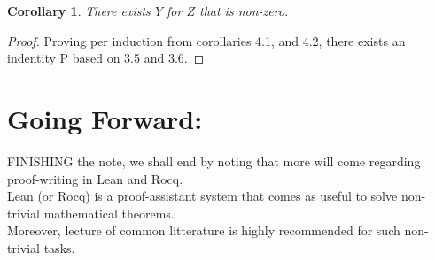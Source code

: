 \documentclass[10pt]{article}
\theoremstyle{plain}
\newtheorem{corollary}[theorem]{Corollary}
\theoremstyle{definition}
\theoremstyle{remark}
\begin{document}
\begin{corollary}
	There exists $Y$ for $Z$ that is non-zero.
\end{corollary}

\begin{proof}
	Proving per induction from corollaries 4.1, and 4.2, there exists an indentity P based on 3.5 and 3.6.
\end{proof}

\section{Going Forward:}

\lettrine[lines=2, lhang=0.1, loversize=0.2]{F}INISHING the note, we shall end by noting that more will come regarding proof-writing in Lean and Rocq.\\Lean (or Rocq) is a proof-assistant system that comes as useful to solve non-trivial mathematical theorems.\\Moreover, lecture of common litterature is highly recommended for such non-trivial tasks.

\nocite{*}





\end{document}
